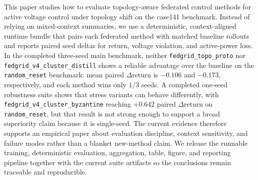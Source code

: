 This paper studies how to evaluate topology-aware federated control methods for active voltage control under topology shift on the case141 benchmark. Instead of relying on mixed-context summaries, we use a deterministic, context-aligned runtime bundle that pairs each federated method with matched baseline rollouts and reports paired seed deltas for return, voltage violation, and active-power loss. In the completed three-seed main benchmark, neither \texttt{fedgrid\_topo\_proto} nor \texttt{fedgrid\_v4\_cluster\_distill} shows a reliable advantage over the baseline on the \texttt{random\_reset} benchmark: mean paired $\Delta$return is $-0.106$ and $-0.173$, respectively, and each method wins only $1/3$ seeds. A completed one-seed robustness suite shows that stress variants can behave differently, with \texttt{fedgrid\_v4\_cluster\_byzantine} reaching $+0.642$ paired $\Delta$return on \texttt{random\_reset}, but that result is not strong enough to support a broad superiority claim because it is single-seed. The current evidence therefore supports an empirical paper about evaluation discipline, context sensitivity, and failure modes rather than a blanket new-method claim. We release the runnable training, deterministic evaluation, aggregation, table, figure, and reporting pipeline together with the current suite artifacts so the conclusions remain traceable and reproducible.
